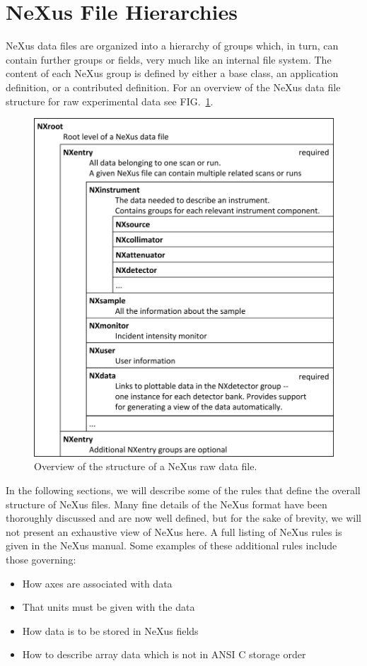 \documentclass[%
 aip,
rsi,
 amsmath,amssymb,
 reprint,%
]{revtex4-1}
\begin{document}
\section{NeXus File Hierarchies}
NeXus data files are organized into a hierarchy of groups which, in turn, can contain further groups or fields, 
very much like an internal file system. The content of each NeXus group is defined by either a base class, 
an application definition, or a contributed definition.
For an overview of the NeXus data file structure for raw experimental data see FIG.~\ref{rawfile}.
\begin{figure}
\includegraphics[width=\columnwidth]{figure1}
\caption{\label{rawfile}Overview of the structure of a NeXus raw data file.}
\end{figure}

In the following sections, we will describe some of the rules that define the overall structure of NeXus files. Many fine details 
of the NeXus format have been thoroughly discussed and are now well defined, but for the sake of brevity, we will not present an 
exhaustive view of NeXus here. A full listing of NeXus rules is given in the NeXus manual\cite{nxman}. Some examples of these 
additional rules include those governing:
\begin{itemize}
\item How axes are associated with data
\item That units must be given with the data
\item How data is to be stored in NeXus fields
\item How to describe array data which is not in ANSI C storage order
\end{itemize}
\end{document}

